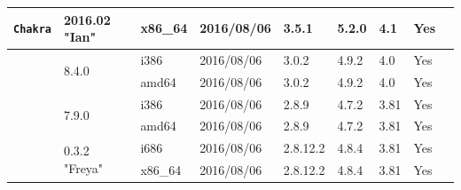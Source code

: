\documentclass[11pt,twoside,openany,x11names,svgnames]{memoir}
\begin{document}
{\begin{longtable}{| >{\bfseries}p{3cm} | p{2.6cm} | p{1cm} | p{1.5cm} | p{1cm} | p{0.7cm} | p{0.7cm} | p{0.8cm} | p{1.5cm} |}
	\texttt{Chakra}                               & 2016.02 "Ian"                  & x86\_64& 2016/08/06  & 3.5.1    & 5.2.0 & 4.1   & Yes   &  \\	
	
	\hline
	\hline
	
	\multirow{4}{*}{\texttt{Debian}}              & \multirow{2}{*}{8.4.0}         & i386   & 2016/08/06  & 3.0.2    & 4.9.2 & 4.0   & Yes   &  \\
											    							       \cline{3-8}
	                                              &                                & amd64  & 2016/08/06  & 3.0.2    & 4.9.2 & 4.0   & Yes   &  \\
	                                              \cline{2-8}
	                                              & \multirow{2}{*}{7.9.0}         & i386   & 2016/08/06  & 2.8.9    & 4.7.2 & 3.81  & Yes   &  \\
	                                            							       \cline{3-8}
	                                              &                                & amd64  & 2016/08/06  & 2.8.9    & 4.7.2 & 3.81  & Yes   &  \\
	
	\hline
	\hline
	
	\multirow{2}{*}{\texttt{elementary OS}}       & \multirow{2}{*}{0.3.2 "Freya"} & i686   & 2016/08/06  & 2.8.12.2 & 4.8.4 & 3.81  & Yes   &  \\
											    							       \cline{3-8}
	                                              &                                & x86\_64& 2016/08/06  & 2.8.12.2 & 4.8.4 & 3.81  & Yes   &  \\
	                                             
	\hline
	\hline
	

\end{longtable}}
\end{document}

